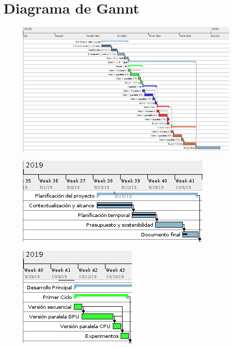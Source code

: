 \documentclass[titlepage,12pt]{report}
\begin{document}
\section{Diagrama de Gannt}
\begin{landscape}
	\begin{figure}[H]
		\centering
		\includegraphics[scale=2]{media/gantt.png}
		\label{gantt}
	\end{figure}
\end{landscape}

\begin{figure}[H]
\centering
\begin{minipage}{.5\textwidth}
  \centering
  \includegraphics[scale=0.55]{media/gantt_1.png} %
  \label{gantt_1}
\end{minipage}%
\begin{minipage}{.5\textwidth}
  \centering
  \includegraphics[scale=0.75]{media/gantt_2.png}
  \label{gantt_2}
\end{minipage}
\end{figure}
\end{document}
